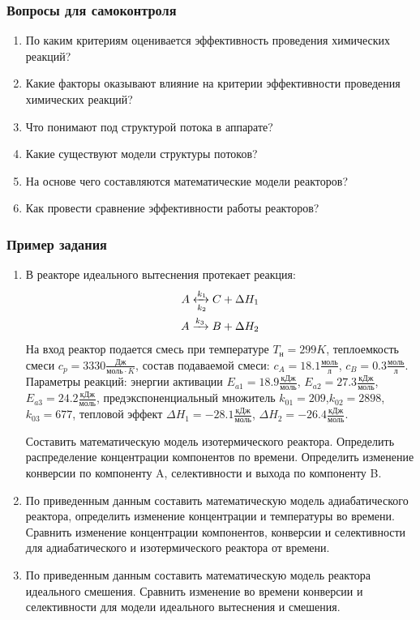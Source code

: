 \subsubsection*{Вопросы для самоконтроля}
\begin{enumerate}
	\item По каким критериям оценивается эффективность проведения химических реакций?
	\item Какие факторы оказывают влияние на критерии эффективности проведения химических реакций?
	\item Что понимают под структурой потока в аппарате?
	\item Какие существуют модели структуры потоков?
	\item На основе чего составляются математические модели реакторов?
	\item Как провести сравнение эффективности работы реакторов?
\end{enumerate}

\subsubsection*{Пример задания}
\begin{enumerate}
	\item В реакторе идеального вытеснения протекает реакция: \begin{equation*} \begin{aligned} A \xleftrightarrow[k_2]{k_1} C + \Delta H_1 \\ A \xrightarrow{k_3} B + \Delta H_2 \end{aligned} \end{equation*}                              На вход  реактор подается смесь при температуре $ T_{н} =  299 K$, теплоемкость смеси $c_p= 3330 \frac{Дж}{моль \cdot K}$, состав подаваемой смеси: $c_A=18.1 \frac{моль}{л}$, $c_B=0.3 \frac{моль}{л}$. Параметры реакций: энергии активации $E_{a1}=18.9 \frac{кДж}{моль}$, $E_{a2}=27.3  \frac{кДж}{моль}$, $E_{a3}=24.2  \frac{кДж}{моль}$, предэкспоненциальный множитель $k_{01}=       209$,$k_{02}=      2898$,$k_{03}=       677$, тепловой эффект $\Delta H_1= -28.1  \frac{кДж}{моль}$, $\Delta H_2=-26.4 \frac{кДж}{моль}$.
	
	Составить математическую модель изотермического реактора. Определить распределение концентрации компонентов по времени. Определить изменение конверсии по компоненту A, селективности и выхода по компоненту B. 
	\item  По приведенным данным составить математическую модель адиабатического реактора, определить изменение концентрации и температуры во времени. Сравнить изменение концентрации компонентов, конверсии и селективности для адиабатического и изотермического реактора от времени. 
	\item  По приведенным данным составить математическую модель реактора идеального смешения. Сравнить изменение во времени конверсии и селективности для модели идеального вытеснения и смешения.
\end{enumerate}